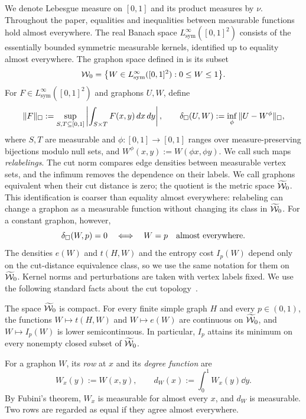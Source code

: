 We denote Lebesgue measure on $[0,1]$ and its product measures by $\nu$.
Throughout the paper, equalities and inequalities between measurable
functions hold almost everywhere.  The real Banach space
$L^\infty_{\mathrm{sym}}([0,1]^2)$ consists of the essentially bounded
symmetric measurable kernels, identified up to equality almost everywhere.
The graphon space defined in  is its subset
\[
  \mathcal W_0=\bigl\{W\in L^\infty_{\mathrm{sym}}([0,1]^2):0\le W\le1\bigr\}.
\]
For $F\in L^\infty_{\mathrm{sym}}([0,1]^2)$ and graphons $U,W$, define
\[
  \|F\|_\square:=\sup_{S,T\subseteq[0,1]}
       \left|\int_{S\times T}F(x,y)\,d x\,d y\right|,
  \qquad
  \delta_\square(U,W):=\inf_\phi\|U-W^\phi\|_\square,
\]
where $S,T$ are measurable and $\phi:[0,1]\to[0,1]$ ranges over
measure-preserving bijections modulo null sets, and $W^\phi(x,y):=W(\phi x,\phi y)$.
We call such maps \emph{relabelings}.
The cut norm compares edge densities between measurable vertex sets,
and the infimum removes the dependence on their labels. We call graphons
equivalent when their cut distance is zero; the quotient is the metric
space $\widetilde{\mathcal W}_0$.
This identification is coarser than equality almost everywhere: relabeling
can change a graphon as a measurable function without changing its class in
$\widetilde{\mathcal W}_0$.  For a constant graphon, however,
\[
  \delta_\square(W,p)=0\quad\Longleftrightarrow\quad W=p
  \quad\text{almost everywhere}.
\]
The densities $e(W)$ and $t(H,W)$ and the entropy cost $I_p(W)$
depend only on the cut-distance equivalence class, so we use the same
notation for them on $\widetilde{\mathcal W}_0$. Kernel norms and perturbations
are taken with vertex labels fixed.
We use the following standard facts about the cut
topology~\cite{LovaszGraphLimits,ChatterjeeVaradhanLDP}.

\begin{lemma}\label{lem:graphon-compactness}
The space $\widetilde{\mathcal W}_0$ is compact.  For every finite simple graph $H$
and every $p\in(0,1)$, the functions $W\mapsto t(H,W)$ and $W\mapsto e(W)$
are continuous on $\widetilde{\mathcal W}_0$, and $W\mapsto I_p(W)$ is lower
semicontinuous.  In particular, $I_p$ attains its minimum on every
nonempty closed subset of $\widetilde{\mathcal W}_0$.
\end{lemma}

For a graphon $W$, its \emph{row} at $x$ and its
\emph{degree function} are
\[
  W_x(y):=W(x,y),\qquad
  d_W(x):=\int_0^1W_x(y)\dd y.
\]
By Fubini's theorem, $W_x$ is measurable for almost every $x$, and $d_W$
is measurable.  Two rows are regarded as equal if they agree almost
everywhere.

